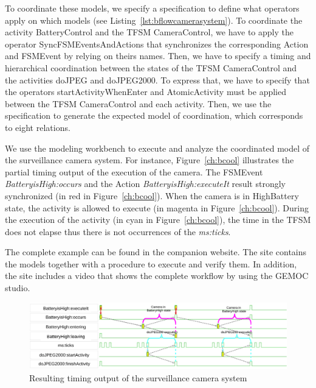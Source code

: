 To coordinate these models, we specify a \bflow specification to define what operators apply on which models (see Listing~\ref{lst:bflowcamerasystem}). To coordinate the activity BatteryControl and the TFSM CameraControl, we have to apply the operator SyncFSMEventsAndActions that synchronizes the corresponding Action and FSMEvent by relying on theirs names. Then, we have to specify a timing and hierarchical coordination between the states of the TFSM CameraControl and the activities doJPEG and doJPEG2000. To express that, we have to specify that the operators startActivityWhenEnter and AtomicActivity must be applied between the TFSM CameraControl and each activity. Then, we use the \bflow specification to generate the expected model of coordination, which corresponds to eight \ccsl relations.

We use the modeling workbench to execute and analyze the coordinated model of the surveillance camera system. For instance, Figure~\ref{ch:bcool} illustrates the partial timing output of the execution of the camera. The \mse FSMEvent \emph{BatteryisHigh:occurs} and the Action \emph{BatteryisHigh:executeIt} result strongly synchronized (in red in Figure~\ref{ch:bcool}). When the camera is in HighBattery state, the activity is allowed to execute (in magenta in Figure~\ref{ch:bcool}). During the execution of the activity (in cyan in Figure~\ref{ch:bcool}), the time in the TFSM does not elapse thus there is not occurrences of the \mse \emph{ms:ticks}.
	
The complete example can be found in the companion website. The site contains the models together with a procedure to execute and verify them. In addition, the site includes a video that shows the complete workflow by using the GEMOC studio. 
	 
	 
	 
	
	
	



	
	
		\begin{figure}
			\center
			\includegraphics[width=1\columnwidth]{examples/figs/vcdcamera}
			\caption{Resulting timing output of the surveillance camera system}
			\label{fig:camerasystem}
		\end{figure}
	
